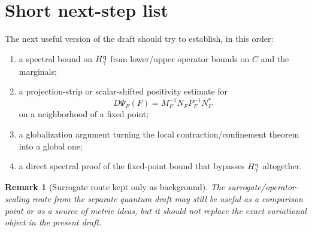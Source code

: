 \documentclass[11pt]{article}
\theoremstyle{plain}
\newtheorem{remark}{Remark}[section]
\begin{document}
\section{Short next-step list}

The next useful version of the draft should try to establish, in this order:
\begin{enumerate}[label=\textnormal{(\arabic*)}]
\item a spectral bound on $H_\gamma^{\rm q}$ from lower/upper operator bounds on $C$ and the marginals;
\item a projection-strip or scalar-shifted positivity estimate for
\[
D\Psi_F(F)=M_F^{-1}N_F P_F^{-1}N_F^\ast
\]
on a neighborhood of a fixed point;
\item a globalization argument turning the local contraction/confinement theorem into a global one;
\item a direct spectral proof of the fixed-point bound that bypasses $H_\gamma^{\rm q}$ altogether.
\end{enumerate}

\begin{remark}[Surrogate route kept only as background]
The surrogate/operator-scaling route from the separate quantum draft may still be useful as a comparison point or as a source of metric ideas, but it should not replace the exact variational object in the present draft.
\end{remark}
\end{document}
